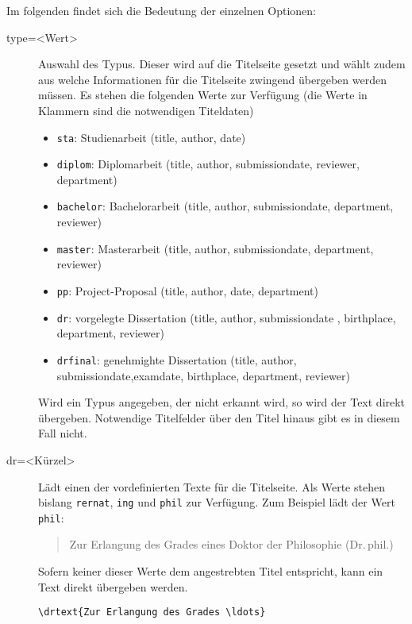 \documentclass[
	ngerman,
	ruledheaders=chapter,%
	class=book,%
	thesis={
		type=dr,
		dr=rernat
	},
	accentcolor=9c,%
	custommargins=true,%
	marginpar=false,%
	parskip=half-,%
	fontsize=11pt,%
]{tudapub}
\let\code\texttt
\begin{document}
Im folgenden findet sich die Bedeutung der einzelnen Optionen:
\begin{description}
\item[type=<Wert>] Auswahl des Typus. Dieser wird auf die Titelseite gesetzt und wählt zudem aus welche Informationen für die Titelseite zwingend übergeben werden müssen.
Es stehen die folgenden Werte zur Verfügung (die Werte in Klammern sind die notwendigen Titeldaten)
\begin{itemize}
\item \code{sta}: Studienarbeit (title, author, date)
\item \code{diplom}: Diplomarbeit (title, author, submissiondate, reviewer, department)
\item \code{bachelor}: Bachelorarbeit (title, author, submissiondate, department, reviewer)
\item \code{master}: Masterarbeit (title, author, submissiondate, department, reviewer)
\item \code{pp}: Project-Proposal  (title, author, date, department)
\item \code{dr}: vorgelegte Dissertation (title, author, submissiondate , birthplace, department, reviewer)
\item \code{drfinal}: genehmighte Dissertation (title, author, submissiondate,examdate, birthplace, department, reviewer)
\end{itemize}
Wird ein Typus angegeben, der nicht erkannt wird, so wird der Text direkt übergeben. Notwendige Titelfelder über den Titel hinaus gibt es in diesem Fall nicht.
\item[dr=<Kürzel>] Lädt einen der vordefinierten Texte für die Titelseite. Als Werte stehen bislang \code{rernat}, \code{ing} und \code{phil} zur Verfügung. Zum Beispiel lädt der Wert \code{phil}:
\begin{quote}
Zur Erlangung des Grades eines Doktor der Philosophie (Dr.\,phil.)
\end{quote}
Sofern keiner dieser Werte dem angestrebten Titel entspricht, kann ein Text direkt übergeben werden.
\begin{verbatim}
\drtext{Zur Erlangung des Grades \ldots}
\end{verbatim}


\end{description}
\end{document}
